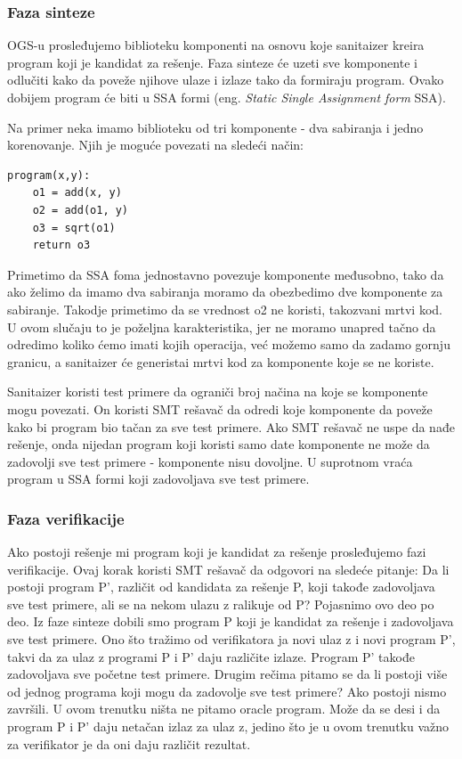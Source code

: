 \subsubsection*{Faza sinteze}
 OGS-u prosleđujemo biblioteku komponenti na osnovu koje sanitaizer kreira program koji je kandidat za rešenje. Faza sinteze će uzeti sve komponente i odlučiti kako da poveže njihove ulaze i izlaze tako da formiraju program. Ovako dobijem program će biti u SSA formi (eng. \emph{Static Single Assignment form} SSA).

 Na primer neka imamo biblioteku od tri komponente - dva sabiranja i jedno korenovanje. Njih je moguće povezati na sledeći način:

\begin{lstlisting}
program(x,y):
	o1 = add(x, y)
	o2 = add(o1, y)
	o3 = sqrt(o1)
	return o3
\end{lstlisting}


 Primetimo da SSA foma jednostavno povezuje komponente međusobno, tako da ako želimo da imamo dva sabiranja moramo da obezbedimo dve komponente za sabiranje. Takodje primetimo da se vrednost o2 ne koristi, takozvani mrtvi kod. U ovom slučaju to je poželjna karakteristika, jer ne moramo unapred tačno da odredimo koliko ćemo imati kojih operacija, već možemo samo da zadamo gornju granicu, a sanitaizer će generistai mrtvi kod za komponente koje se ne koriste.

 Sanitaizer koristi test primere da ograniči broj načina na koje se komponente mogu povezati. On koristi SMT rešavač da odredi koje komponente da poveže kako bi program bio tačan za sve test primere. Ako SMT rešavač ne uspe da nađe rešenje, onda nijedan program koji koristi samo date komponente ne može da zadovolji sve test primere - komponente nisu dovoljne. U suprotnom vraća program u SSA formi koji zadovoljava sve test primere.

\subsubsection*{Faza verifikacije}

Ako postoji rešenje mi program koji je kandidat za rešenje prosleđujemo fazi verifikacije. Ovaj korak koristi SMT rešavač da odgovori na sledeće pitanje: Da li postoji program P', različit od kandidata za rešenje P, koji takođe zadovoljava sve test primere, ali se na nekom ulazu z ralikuje od P?
Pojasnimo ovo deo po deo. Iz faze sinteze dobili smo program P koji je kandidat za rešenje i zadovoljava sve test primere. Ono što tražimo od verifikatora ja novi ulaz z i novi program P', takvi da za ulaz z programi P i P' daju različite izlaze. Program P' takođe zadovoljava sve početne test primere.
Drugim rečima pitamo se da li postoji više od jednog programa koji mogu da zadovolje sve test primere? Ako postoji nismo završili.
U ovom trenutku ništa ne pitamo oracle program. Može da se desi i da program P i P' daju netačan izlaz za ulaz z, jedino što je u ovom trenutku važno za verifikator je da oni daju različit rezultat.

